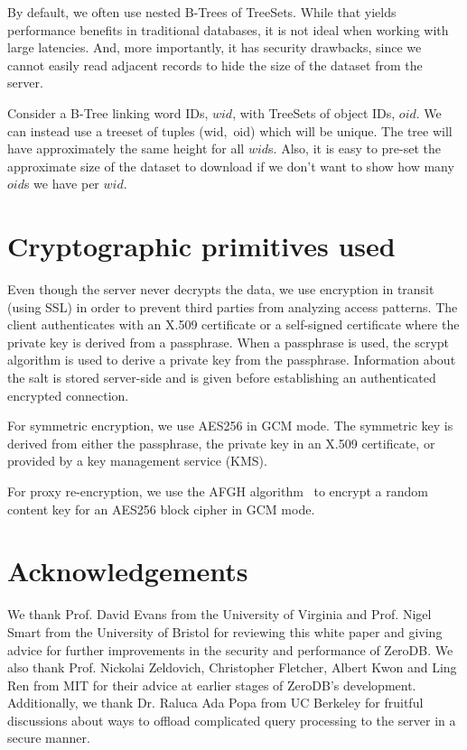 \documentclass[notitlepage,longbibliography]{revtex4-1}
\begin{document}
By default, we often use nested B-Trees of TreeSets.
While that yields performance benefits in traditional databases, it is not ideal when working with large latencies.
And, more importantly, it has security drawbacks, since we cannot easily read adjacent records to hide the size of the dataset from the server.

Consider a B-Tree linking word IDs, $wid$, with TreeSets of object IDs, $oid$.
We can instead use a treeset of tuples (wid,~oid) which will be unique.
The tree will have approximately the same height for all $wid$s.
Also, it is easy to pre-set the approximate size of the dataset to download if we don't want to show how many $oid$s we have per $wid$.

\section{Cryptographic primitives used}

Even though the server never decrypts the data, we use encryption in transit (using SSL) in order to prevent third parties from analyzing access patterns.
The client authenticates with an X.509 certificate or a self-signed certificate where the private key is derived from a passphrase.
When a passphrase is used, the scrypt algorithm is used to derive a private key from the passphrase. Information about the salt is stored server-side and is given before establishing an authenticated encrypted connection.

For symmetric encryption, we use AES256 in GCM mode.
The symmetric key is derived from either the passphrase, the private key in an X.509 certificate, or provided by a key management service (KMS).

For proxy re-encryption, we use the AFGH algorithm~\cite{afgh} to encrypt a random content key for an AES256 block cipher in GCM mode.

\section{Acknowledgements}

We thank Prof. David Evans from the University of Virginia and Prof. Nigel Smart from the University of Bristol for reviewing this white paper
and giving advice for further improvements in the security and performance of ZeroDB.
We also thank Prof. Nickolai Zeldovich, Christopher Fletcher, Albert Kwon and Ling Ren from MIT for their advice at earlier stages of ZeroDB's development.
Additionally, we thank Dr. Raluca Ada Popa from UC Berkeley for fruitful discussions about ways to offload complicated query processing to the server
in a secure manner.


\end{document}
